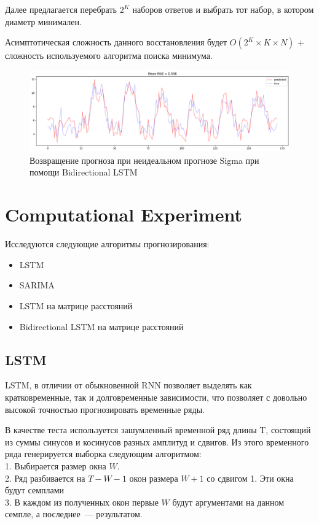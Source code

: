 \documentclass{article}
\begin{document}
Далее предлагается перебрать $2^K$ наборов ответов и выбрать тот набор, в котором диаметр минимален.

Асимптотическая сложность данного восстановления будет $O(2^K \times K \times N)$ + сложность используемого алгоритма поиска минимума.

\begin{figure}[H]
	\centering
	\includegraphics[width=\textwidth]{TbiLSTM.png}
	\caption{Возвращение прогноза при неидеальном прогнозе Sigma при помощи Bidirectional LSTM}
	\label{fig:fig4}
\end{figure}

\section{Computational Experiment}

Исследуются следующие алгоритмы прогнозирования:

\begin{itemize}
	\item LSTM \cite{LSTM}
	\item SARIMA \cite{ARIMAvsLSTM}
	\item LSTM на матрице расстояний
	\item Bidirectional LSTM на матрице расстояний
\end{itemize}

\subsection{LSTM}

LSTM, в отличии от обыкновенной RNN позволяет выделять как кратковременные, так и долговременные зависимости, что позволяет с довольно высокой точностью прогнозировать временные ряды.

В качестве теста используется зашумленный временной ряд длины T, состоящий из суммы синусов и косинусов разных амплитуд и сдвигов. Из этого временного ряда генерируется выборка следующим алгоритмом:\\
1. Выбирается размер окна $W$.\\
2. Ряд разбивается на $T-W-1$ окон размера $W+1$ со сдвигом 1. Эти окна будут семплами\\
3. В каждом из полученных окон первые $W$ будут аргументами на данном семпле, а последнее~--- результатом.
\end{document}
